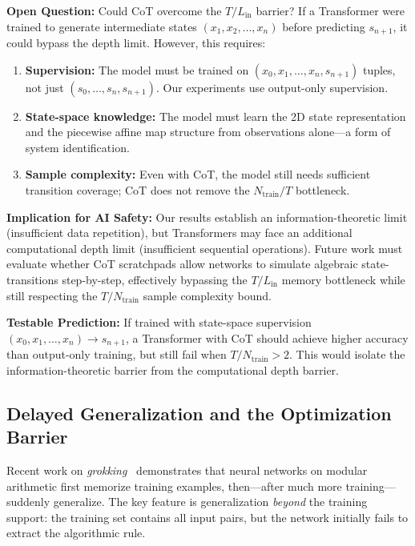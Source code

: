 \documentclass[11pt]{article}
\theoremstyle{plain}
\theoremstyle{definition}
\begin{document}
\textbf{Open Question:} Could CoT overcome the $T/L_{\mathrm{in}}$ barrier? If a Transformer were trained to generate intermediate states $(x_1, x_2, \ldots, x_n)$ before predicting $s_{n+1}$, it could bypass the depth limit. However, this requires:
\begin{enumerate}[leftmargin=2em]
\item \textbf{Supervision:} The model must be trained on $(x_0, x_1, \ldots, x_n, s_{n+1})$ tuples, not just $(s_0, \ldots, s_n, s_{n+1})$. Our experiments use output-only supervision.
\item \textbf{State-space knowledge:} The model must learn the 2D state representation and the piecewise affine map structure from observations alone---a form of system identification.
\item \textbf{Sample complexity:} Even with CoT, the model still needs sufficient transition coverage; CoT does not remove the $N_{\mathrm{train}}/T$ bottleneck.
\end{enumerate}

\textbf{Implication for AI Safety:} Our results establish an information-theoretic limit (insufficient data repetition), but Transformers may face an additional computational depth limit (insufficient sequential operations). Future work must evaluate whether CoT scratchpads allow networks to simulate algebraic state-transitions step-by-step, effectively bypassing the $T/L_{\mathrm{in}}$ memory bottleneck while still respecting the $T/N_{\mathrm{train}}$ sample complexity bound.

\textbf{Testable Prediction:} If trained with state-space supervision $(x_0, x_1, \ldots, x_n) \to s_{n+1}$, a Transformer with CoT should achieve higher accuracy than output-only training, but still fail when $T/N_{\mathrm{train}} > 2$. This would isolate the information-theoretic barrier from the computational depth barrier.

\subsection{Delayed Generalization and the Optimization Barrier}

Recent work on \emph{grokking}~\citep{Power2022} demonstrates that neural networks on modular arithmetic first memorize training examples, then---after much more training---suddenly generalize. The key feature is generalization \emph{beyond} the training support: the training set contains all input pairs, but the network initially fails to extract the algorithmic rule.
\end{document}

